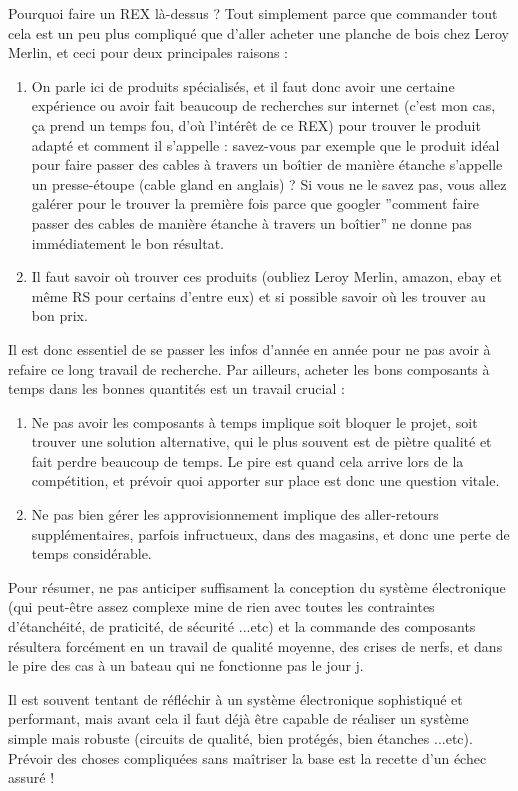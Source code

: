 \documentclass[a4paper, 11pt]{report}
\begin{document}
Pourquoi faire un REX là-dessus ? Tout simplement parce que commander
tout cela est un peu plus compliqué que d'aller acheter une planche
de bois chez Leroy Merlin, et ceci pour deux principales raisons : 
\begin{enumerate}
\item On parle ici de produits spécialisés, et il faut donc avoir une certaine
expérience ou avoir fait beaucoup de recherches sur internet (c'est
mon cas, ça prend un temps fou, d'où l'intérêt de ce REX) pour trouver
le produit adapté et comment il s'appelle : savez-vous par exemple
que le produit idéal pour faire passer des cables à travers un boîtier
de manière étanche s'appelle un presse-étoupe (cable gland en anglais)
? Si vous ne le savez pas, vous allez galérer pour le trouver la première
fois parce que googler ''comment faire passer des cables de manière
étanche à travers un boîtier'' ne donne pas immédiatement le bon
résultat.
\item Il faut savoir où trouver ces produits (oubliez Leroy Merlin, amazon,
ebay et même RS pour certains d'entre eux) et si possible savoir où
les trouver au bon prix.
\end{enumerate}
Il est donc essentiel de se passer les infos d'année en année pour
ne pas avoir à refaire ce long travail de recherche. Par ailleurs,
acheter les bons composants à temps dans les bonnes quantités est
un travail crucial :
\begin{enumerate}
\item Ne pas avoir les composants à temps implique soit bloquer le projet,
soit trouver une solution alternative, qui le plus souvent est de
piètre qualité et fait perdre beaucoup de temps. Le pire est quand
cela arrive lors de la compétition, et prévoir quoi apporter sur place
est donc une question vitale.
\item Ne pas bien gérer les approvisionnement implique des aller-retours
supplémentaires, parfois infructueux, dans des magasins, et donc une
perte de temps considérable.
\end{enumerate}
Pour résumer, ne pas anticiper suffisament la conception du système
électronique (qui peut-être assez complexe mine de rien avec toutes
les contraintes d'étanchéité, de praticité, de sécurité ...etc) et
la commande des composants résultera forcément en un travail de qualité
moyenne, des crises de nerfs, et dans le pire des cas à un bateau
qui ne fonctionne pas le jour j.

Il est souvent tentant de réfléchir à un système électronique sophistiqué
et performant, mais avant cela il faut déjà être capable de réaliser
un système simple mais robuste (circuits de qualité, bien protégés,
bien étanches ...etc). Prévoir des choses compliquées sans maîtriser
la base est la recette d'un échec assuré !
\end{document}
